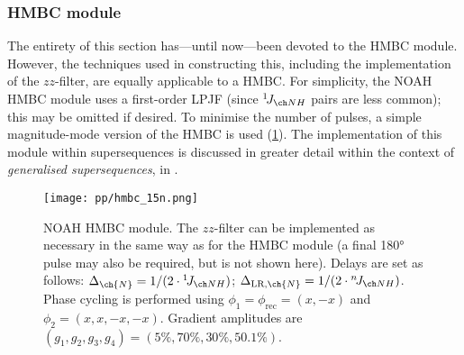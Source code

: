 \subsubsection{\nitrogen{} HMBC module}

The entirety of this section has---until now---been devoted to the \carbon{} HMBC module.
However, the techniques used in constructing this, including the implementation of the $zz$-filter, are equally applicable to a \nitrogen{} HMBC.
For simplicity, the NOAH \nitrogen{} HMBC module uses a first-order LPJF (since $\oneJ{NH}$ pairs are less common); this may be omitted if desired.
To minimise the number of pulses, a simple magnitude-mode version of the HMBC is used (\cref{fig:noah_15n_hmbc}).
The implementation of this module within supersequences is discussed in greater detail within the context of \textit{generalised supersequences}, in .

\begin{figure}[htb]
    \centering
    \texttt{[image: pp/hmbc\_15n.png]}%
    \caption[NOAH \nitrogen{} HMBC module]{
        NOAH \nitrogen{} HMBC module.
        The $zz$-filter can be implemented as necessary in the same way as for the \carbon{} HMBC module (a final \proton{} \ang{180} pulse may also be required, but is not shown here).
        Delays are set as follows: $\Delta_{\ch{N}} = 1 / (2 \cdot \oneJ{NH})$; $\Delta_{\text{LR},\ch{N}} = 1 / (2 \cdot \nJ{NH})$.
        Phase cycling is performed using $\phi_1 = \phi_\text{rec} = (x, -x)$ and $\phi_2 = (x, x, -x, -x)$.
        Gradient amplitudes are $(g_1, g_2, g_3, g_4) = (5\%, 70\%, 30\%, 50.1\%)$.
    }
    \label{fig:noah_15n_hmbc}
\end{figure}
